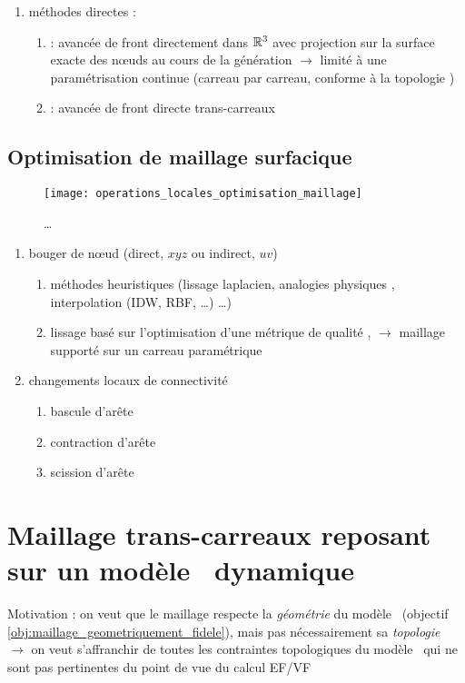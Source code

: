 \begin{enumerate}
	\item méthodes directes : 
	\begin{enumerate}
		\item \cite{lau1996} : avancée de front directement dans $\mathbb{R}^3$ avec projection sur la surface exacte des n\oe uds au cours de la génération $\to$ limité à une paramétrisation continue (\ie carreau par carreau, conforme à la topologie \brep)
		\item \cite{foucault2013} : avancée de front directe trans-carreaux
	\end{enumerate}
\end{enumerate}







\subsection{Optimisation de maillage surfacique}
\begin{figure}
\centering
\texttt{[image: operations\_locales\_optimisation\_maillage]}
\caption{\ldots}
\label{fig:operations_locales_optimisation_maillage}
\end{figure}

\begin{enumerate}
	\item bouger de n\oe ud (direct, \ie $xyz$ ou indirect, \ie $uv$)
	\begin{enumerate}
		\item méthodes heuristiques (lissage laplacien, analogies physiques \cite{farhat1998}, interpolation (IDW, RBF, \ldots) \ldots)
		\item lissage basé sur l'optimisation d'une métrique de qualité \cite{freitag1995, canann1998, jiao2008}, \cite{gargallo2014} $\to$ maillage supporté sur un carreau paramétrique
	\end{enumerate}
	\item changements locaux de connectivité
	\begin{enumerate}
		\item bascule d'arête
		\item contraction d'arête
		\item scission d'arête
	\end{enumerate}
\end{enumerate}





\section{Maillage trans-carreaux reposant sur un modèle \brep\ dynamique}
Motivation : on veut que le maillage respecte la \textit{géométrie} du modèle \brep\ (\cf objectif \ref{obj:maillage_geometriquement_fidele}), mais pas nécessairement sa \textit{topologie}\\
$\to$ on veut s'affranchir de toutes les contraintes topologiques du modèle \brep\ qui ne sont pas pertinentes du point de vue du calcul EF/VF



